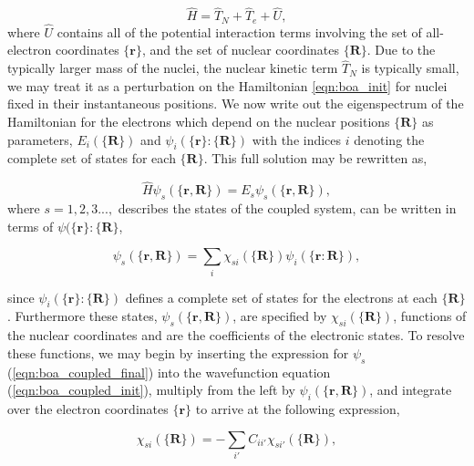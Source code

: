 \begin{equation}
    \hat{H} = \hat{T}_{N} + \hat{T}_{e} + \hat{U},
    \label{eqn:boa_init}
\end{equation}
where $\hat{U}$ contains all of the potential interaction terms involving the set of all-electron coordinates $\{ \mathbf{r} \}$, and the set of nuclear coordinates $\{  \mathbf{R} \}$. Due to the typically larger mass of the nuclei, the nuclear kinetic term $\hat{T}_{N}$ is typically small, we may treat it as a perturbation on the Hamiltonian \ref{eqn:boa_init} for nuclei fixed in their instantaneous positions. We now write out the eigenspectrum of the Hamiltonian for the electrons which depend on the nuclear positions $\{ \mathbf{R} \}$ as parameters, $E_{i}( \{ \mathbf{R} \} ) $ and $\psi_{i}(\{ \mathbf{r} \} : \{ \mathbf{R} \})$ with the indices $i$ denoting the complete set of states for each $\{ \mathbf{R} \}$. This full solution may be rewritten as,

\begin{equation}
    \hat{H} \psi_{s}(\{ \mathbf{r}, \mathbf{R} \}) = E_{s}\psi_{s}(\{ \mathbf{r}, \mathbf{R} \}),
    \label{eqn:boa_coupled_init}
\end{equation}
where $s=1,2,3...,$ describes the states of the coupled system, can be written in terms of $\psi( \{ \mathbf{r} \}: \{ \mathbf{R} \}$,

\begin{equation}
    \psi_{s}(\{ \mathbf{r}, \mathbf{R} \}) = \sum_{i}\chi_{si}(\{ \textbf{R} \} ) \psi_{i}(\{ \mathbf{r}: \mathbf{R} \}),
    \label{eqn:boa_coupled_final}
\end{equation}

since $\psi_{i}(\{ \textbf{r} \} : \{ \textbf{R} \} )$ defines a complete set of states for the electrons at each $\{ \textbf{R} \}$. Furthermore these states, $\psi_{s}(\{ \textbf{r}, \textbf{R} \})$, are specified by $\chi_{si}(\{ \textbf{R} \} )$, functions of the nuclear coordinates and are the coefficients of the electronic states. To resolve these functions, we may begin by inserting the expression for $\psi_{s}$ (\ref{eqn:boa_coupled_final}) into the wavefunction equation (\ref{eqn:boa_coupled_init}), multiply from the left by $\psi_{i}( \{ \textbf{r}, \textbf{R} \})$, and integrate over the electron coordinates $\{ \textbf{r} \}$ to arrive at the following expression,

\begin{equation}
    [ T_{N} + E_{i}( \{ \textbf{R} \}) - E_{s} ] \chi_{si}(\{ \textbf{R} \}) = - \sum_{i'}C_{ii'}\chi_{si'}(\{ \textbf{R} \}),
    \label{eqn:boa_cont}
\end{equation}

